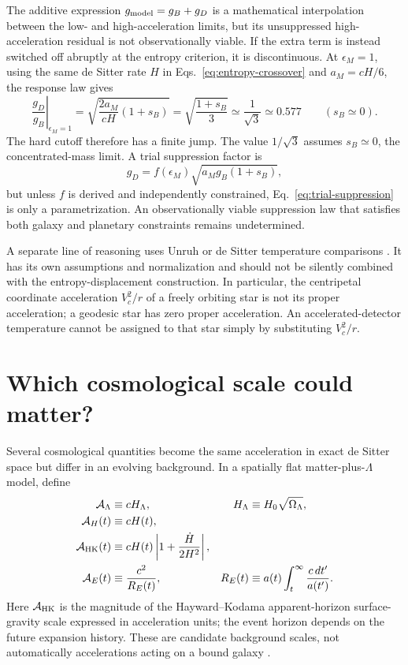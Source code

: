 \documentclass[12pt]{article}
\begin{document}
The additive expression $g_{\rm model}=g_B+g_D$ is a mathematical interpolation between the low- and high-acceleration limits, but its unsuppressed high-acceleration residual is not observationally viable. If the extra term is instead switched off abruptly at the entropy criterion, it is discontinuous. At $\epsilon_M=1$, using the same de Sitter rate $H$ in Eqs.~\eqref{eq:entropy-crossover} and $a_M=cH/6$, the response law gives
\begin{equation}
  \left.\frac{g_D}{g_B}\right|_{\epsilon_M=1}
  =\sqrt{\frac{2a_M}{cH}(1+s_B)}
  =\sqrt{\frac{1+s_B}{3}}
  \simeq\frac{1}{\sqrt{3}}\simeq0.577
  \qquad(s_B\simeq0).
  \label{eq:cutoff-jump}
\end{equation}
The hard cutoff therefore has a finite jump. The value $1/\sqrt{3}$ assumes $s_B\simeq0$, the concentrated-mass limit. A trial suppression factor is
\begin{equation}
  g_D=f(\epsilon_M)\sqrt{a_Mg_B(1+s_B)},
  \label{eq:trial-suppression}
\end{equation}
but unless $f$ is derived and independently constrained, Eq.~\eqref{eq:trial-suppression} is only a parametrization. An observationally viable suppression law that satisfies both galaxy and planetary constraints remains undetermined.

A separate line of reasoning uses Unruh or de Sitter temperature comparisons \cite{Milgrom,DeserLevin}. It has its own assumptions and normalization and should not be silently combined with the entropy-displacement construction. In particular, the centripetal coordinate acceleration $V_c^2/r$ of a freely orbiting star is not its proper acceleration; a geodesic star has zero proper acceleration. An accelerated-detector temperature cannot be assigned to that star simply by substituting $V_c^2/r$.

\section{Which cosmological scale could matter?}
\label{sec:horizons}

Several cosmological quantities become the same acceleration in exact de Sitter space but differ in an evolving background. In a spatially flat matter-plus-$\Lambda$ model, define
\begin{align}
  \mathcal A_\Lambda&\equiv cH_\Lambda,
  &H_\Lambda&\equiv H_0\sqrt{\Omega_\Lambda},\\
  \mathcal A_H(t)&\equiv cH(t),\\
  \mathcal A_{\rm HK}(t)&\equiv cH(t)\left|1+\frac{\dot H}{2H^2}\right|,\\
  \mathcal A_E(t)&\equiv\frac{c^2}{R_E(t)},
  &R_E(t)&\equiv a(t)\int_t^\infty\frac{c\,dt'}{a(t')}.
  \label{eq:horizon-scales}
\end{align}
Here $\mathcal A_{\rm HK}$ is the magnitude of the Hayward--Kodama apparent-horizon surface-gravity scale expressed in acceleration units; the event horizon depends on the future expansion history. These are candidate background scales, not automatically accelerations acting on a bound galaxy \cite{CaiCao}.
\end{document}
